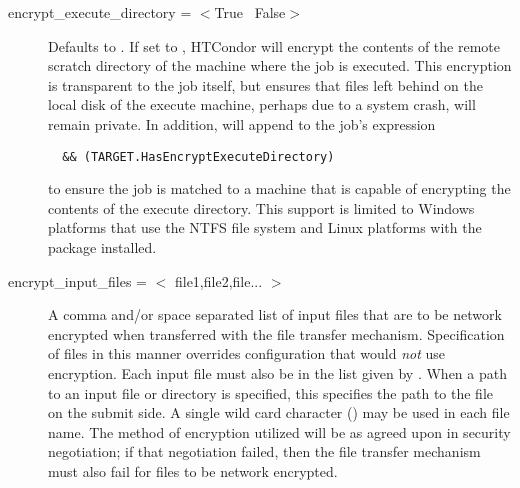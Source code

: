 \begin{description}
\label{man-condor-submit-encrypt-execute-directory}
\item[encrypt\_execute\_directory = $<$True \Bar\ False$>$]
Defaults to . If set to , 
HTCondor will encrypt the contents of
the remote scratch directory of the machine where the job is executed.
This encryption is transparent to the job itself, but ensures that
files left behind on the local disk of the execute machine,
perhaps due to a system crash, 
will remain private.
In addition,  will append to
the job's  expression
\begin{verbatim}
  && (TARGET.HasEncryptExecuteDirectory)
\end{verbatim}
to ensure the job is matched to a machine that is capable of encrypting the
contents of the execute directory.  
This support is limited 
to Windows platforms that use the NTFS file system and
Linux platforms with the  package installed.


\label{man-condor-submit-encrypt-input-files}
\item[encrypt\_input\_files = $<$ file1,file2,file... $>$] 
A comma and/or space separated list of input files that are to be
network encrypted when transferred with the file transfer mechanism.
Specification of files in this manner overrides configuration that would
\emph{not} use encryption.
Each input file must also be in the list given by
.
When a path to an input file or directory is specified, 
this specifies the path to the file on the submit side.
A single wild card character (\Expr{*}) may be used in each file name.
The method of encryption utilized will be as agreed upon in security
negotiation; if that negotiation failed, then the file transfer
mechanism must also fail for files to be network encrypted.



\end{description}
